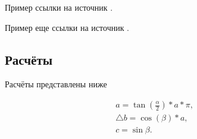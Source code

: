 Пример ссылки на источник .

Пример еще ссылки на источник .

\subsection{Расчёты}

Расчёты представлены ниже

\begin{gather}
	a = \tan(\frac{\alpha}{2})*a*\pi, \\
	\bigtriangleup b = \cos(\beta)*a, \\
	c = \sin{\beta}.
\end{gather}


\examplecommand

